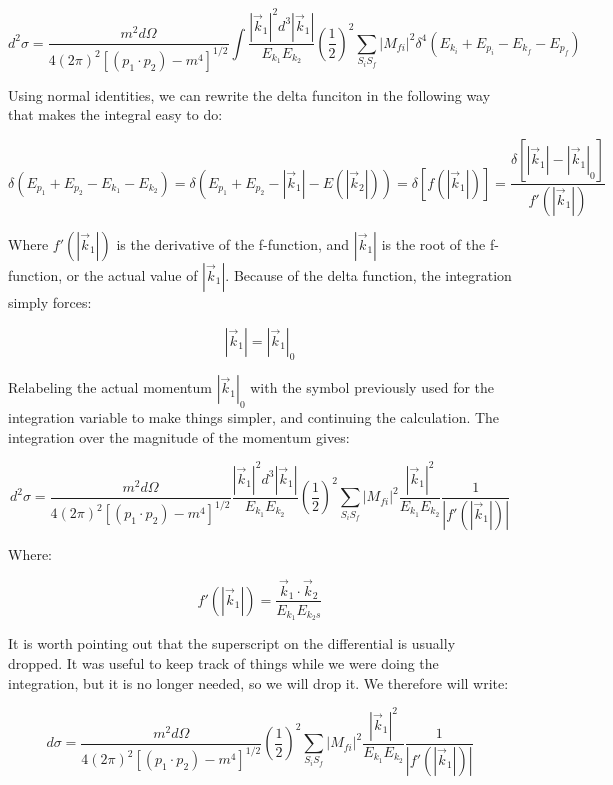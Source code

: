 \documentclass[a4]{article}
\begin{document}
    \begin{equation}
        d^2 \sigma = \frac{m^2 d \Omega}{4 (2 \pi)^2 [(p_1 \cdot p_2) - m^4]^{1/2}} \int \frac{|\vec{k}_1|^2 d^3 |\vec{k}_1|}{E_{k_1} E_{k_2}} (\frac{1}{2})^2 \sum_{S_i S_f} |M_{fi}|^2 \delta^4 (E_{k_i} + E_{p_i} - E_{k_f} - E_{p_f})
    \end{equation}
    
    Using normal identities, we can rewrite the delta funciton in the following way that makes the integral easy to do:

    \begin{equation}
        \delta (E_{p_1} + E_{p_2} - E_{k_1} - E_{k_2}) = \delta (E_{p_1} + E_{p_2} - |\vec{k}_1| - E (|\vec{k}_2|) ) = \delta [f (|\vec{k}_1|)] = \frac{\delta [|\vec{k}_1| - |\vec{k}_1|_0]}{f' (|\vec{k}_1|)}
    \end{equation}

    Where $f'(|\vec{k}_1|)$ is the derivative of the f-function, and $|\vec{k}_1|$ is the root of the f-function, or the actual value of $|\vec{k}_1|$. Because of the delta function, the integration simply forces:

    \[
        |\vec{k}_1| = |\vec{k}_1|_0
    \]

    Relabeling the actual momentum $|\vec{k}_1|_0$ with the symbol previously used for the integration variable to make things simpler, and continuing the calculation. The integration over the magnitude of the momentum gives:

    \begin{equation}
        d^2 \sigma = \frac{m^2 d \Omega}{4 (2 \pi)^2 [(p_1 \cdot p_2) - m^4]^{1/2}} \frac{|\vec{k}_1|^2 d^3 |\vec{k}_1|}{E_{k_1} E_{k_2}} (\frac{1}{2})^2 \sum_{S_i S_f} |M_{fi}|^2 \frac{|\vec{k}_1|^2}{E_{k_1} E_{k_2}} \frac{1}{|f' (|\vec{k}_1|)|}
    \end{equation}

    Where:

    \begin{equation}
        f' (|\vec{k}_1|) = \frac{\vec{k}_1 \cdot \vec{k}_2}{E_{k_1} E_{k_2s}}
    \end{equation}

    It is worth pointing out that the superscript on the differential is usually dropped. It was useful to keep track of things while we were doing the integration, but it is no longer needed, so we will drop it. We therefore will write:
    
    \begin{equation}
        d \sigma = \frac{m^2 d \Omega}{4 (2 \pi)^2 [(p_1 \cdot p_2) - m^4]^{1/2}} (\frac{1}{2})^2 \sum_{S_i S_f} |M_{fi}|^2 \frac{|\vec{k}_1|^2}{E_{k_1} E_{k_2}} \frac{1}{|f' (|\vec{k}_1|)|}
    \end{equation}
\end{document}
